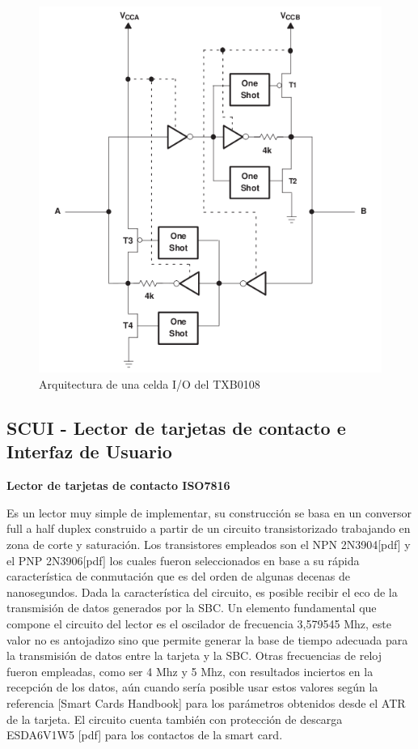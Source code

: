 \bigskip
\bigskip
\begin{figure}[H]
\centering
  \begin{center}
  \includegraphics[scale=.4]{Imagenes/TXB0108.png} 
  \end{center}
  \caption{Arquitectura de una celda I/O del TXB0108}\label{Fig:Celda_TXB0108} 
\end{figure}

\newpage
\subsection{SCUI - Lector de tarjetas de contacto e Interfaz de Usuario}

{\bf{Lector de tarjetas de contacto ISO7816}}

Es un lector muy simple de implementar, su construcción se basa en un conversor full a half duplex construido a partir de un circuito transistorizado trabajando en zona de corte y saturación. Los transistores empleados son el NPN 2N3904[pdf] y el PNP 2N3906[pdf] los cuales fueron seleccionados en base a su rápida característica de conmutación que es del orden de algunas decenas de nanosegundos. Dada la característica del circuito, es posible recibir el eco de la transmisión de datos generados por la SBC. 
Un elemento fundamental que compone el circuito del lector es el oscilador de frecuencia 3,579545 Mhz, este valor no es antojadizo sino que permite generar la base de tiempo adecuada para la transmisión de datos entre la tarjeta y la SBC. Otras frecuencias de reloj fueron empleadas, como ser 4 Mhz y 5 Mhz, con resultados inciertos en la recepción de los datos, aún cuando sería posible usar estos valores según la referencia [Smart Cards Handbook] para los parámetros obtenidos desde el ATR de la tarjeta. 
El circuito cuenta también con protección de descarga ESDA6V1W5 [pdf] para los contactos de la smart card.

